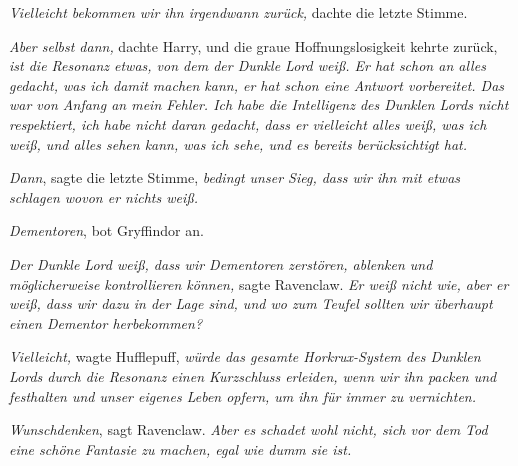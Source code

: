 \emph{Vielleicht bekommen wir ihn irgendwann zurück,} dachte die letzte Stimme.

\emph{Aber selbst dann,} dachte Harry, und die graue Hoffnungslosigkeit kehrte zurück, \emph{ist die Resonanz etwas, von dem der Dunkle Lord weiß. Er hat schon an alles gedacht, was ich damit machen kann, er hat schon eine Antwort vorbereitet. Das war von Anfang an mein Fehler. Ich habe die Intelligenz des Dunklen Lords nicht respektiert, ich habe nicht daran gedacht, dass er vielleicht alles weiß, was ich weiß, und alles sehen kann, was ich sehe, und es bereits berücksichtigt hat.}

\emph{Dann}, sagte die letzte Stimme, \emph{bedingt unser Sieg, dass wir ihn mit etwas schlagen wovon er nichts weiß.}

\emph{Dementoren}, bot Gryffindor an.

\emph{Der Dunkle Lord \emph{weiß}, dass wir Dementoren zerstören, ablenken und möglicherweise kontrollieren können,} sagte Ravenclaw. \emph{Er weiß nicht wie, aber er weiß, dass wir dazu in der Lage sind, und wo zum Teufel sollten wir überhaupt einen Dementor herbekommen?}

\emph{Vielleicht,} wagte Hufflepuff, \emph{würde das gesamte Horkrux-System des Dunklen Lords durch die Resonanz einen Kurzschluss erleiden, wenn wir ihn packen und festhalten und unser eigenes Leben opfern, um ihn für immer zu vernichten.}

\emph{Wunschdenken}, sagt Ravenclaw. \emph{Aber es schadet wohl nicht, sich vor dem Tod eine schöne Fantasie zu machen, egal wie dumm sie ist.}

